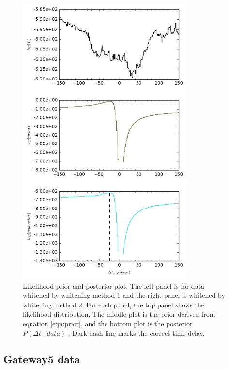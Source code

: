 \documentclass[\docopts]{\docclass}
\begin{document}
\begin{figure}[!h]
\begin{minipage}[bottom]{0.4\textwidth}
\includegraphics[width=\textwidth, height=15cm, keepaspectratio]{whiten2/data4_full_log.png}
  \end{minipage}
 \caption{Likelihood prior and posterior plot. The left panel is for data whitened by whitening method 1 and the right panel is whitened by whitening method 2. For each panel, the top panel shows the likelihood distribution. The middle plot is the prior derived from equation \ref{eqn:prior}, and the bottom plot is the posterior $P(\Delta t \mid data)$ . Dark dash line marks the correct time delay. }
\end{figure}
\newpage

\subsection{Gateway5 data}
\end{document}
